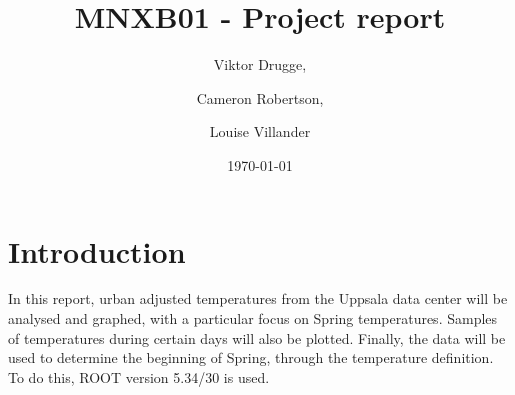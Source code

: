 \documentclass[a4paper,12pt]{article}
\title{\textbf{MNXB01} - Project report}
\date{\today}
\author{Viktor Drugge, \and Cameron Robertson, \and Louise Villander}
\begin{document}
	\maketitle
	\section{Introduction}
	\label{sec:pre}
	In this report, urban adjusted temperatures from the Uppsala data center will be analysed
	and graphed, with a particular focus on Spring temperatures. Samples of temperatures during certain
	days will also be plotted. Finally, the data will be used to determine the beginning of Spring, through
	the temperature definition. To do this, ROOT version 5.34/30 is used.
	
	
	
\end{document}
